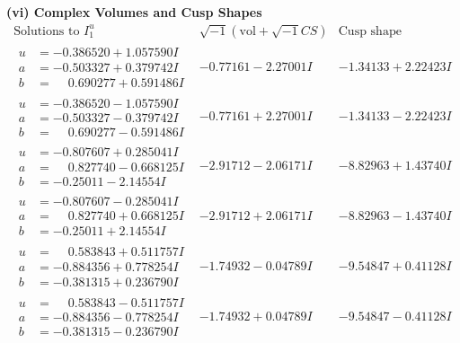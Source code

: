 \documentclass[1p]{elsarticle_modified}
\theoremstyle{definition}
\newcommand{\I}{\sqrt{-1}}
\begin{document}
\newpage\flushleft \textbf{(vi) Complex Volumes and Cusp Shapes}
$$\begin{array}{c|c|c}  
\text{Solutions to }I^u_{1}& \I (\text{vol} + \sqrt{-1}CS) & \text{Cusp shape}\\
 \hline 
\begin{aligned}
u &= -0.386520 + 1.057590 I \\
a &= -0.503327 + 0.379742 I \\
b &= \phantom{-}0.690277 + 0.591486 I\end{aligned}
 & -0.77161 - 2.27001 I & -1.34133 + 2.22423 I \\ \hline\begin{aligned}
u &= -0.386520 - 1.057590 I \\
a &= -0.503327 - 0.379742 I \\
b &= \phantom{-}0.690277 - 0.591486 I\end{aligned}
 & -0.77161 + 2.27001 I & -1.34133 - 2.22423 I \\ \hline\begin{aligned}
u &= -0.807607 + 0.285041 I \\
a &= \phantom{-}0.827740 - 0.668125 I \\
b &= -0.25011 - 2.14554 I\end{aligned}
 & -2.91712 - 2.06171 I & -8.82963 + 1.43740 I \\ \hline\begin{aligned}
u &= -0.807607 - 0.285041 I \\
a &= \phantom{-}0.827740 + 0.668125 I \\
b &= -0.25011 + 2.14554 I\end{aligned}
 & -2.91712 + 2.06171 I & -8.82963 - 1.43740 I \\ \hline\begin{aligned}
u &= \phantom{-}0.583843 + 0.511757 I \\
a &= -0.884356 + 0.778254 I \\
b &= -0.381315 + 0.236790 I\end{aligned}
 & -1.74932 - 0.04789 I & -9.54847 + 0.41128 I \\ \hline\begin{aligned}
u &= \phantom{-}0.583843 - 0.511757 I \\
a &= -0.884356 - 0.778254 I \\
b &= -0.381315 - 0.236790 I\end{aligned}
 & -1.74932 + 0.04789 I & -9.54847 - 0.41128 I \\ \hline\begin{aligned}

\end{aligned}
\end{array}$$
\end{document}
